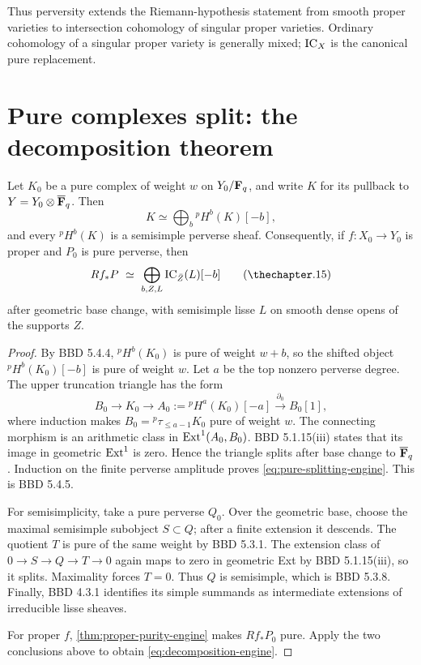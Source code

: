 Thus perversity extends the Riemann-hypothesis statement from smooth proper
varieties to intersection cohomology of singular proper varieties.  Ordinary
cohomology of a singular proper variety is generally mixed; \(\operatorname{IC}_X\) is the
canonical pure replacement.

\section{Pure complexes split: the decomposition theorem}

\begin{theorem}
\label{thm:decomposition-engine}
Let \(K_0\) be a pure complex of weight \(w\) on \(Y_0/\mathbf F_q\), and write
\(K\) for its pullback to \(Y=Y_0\otimes\overline{\mathbf F}_q\).  Then
\[
  K\simeq\bigoplus_b{}^pH^b(K)[-b],
\tag{\thechapter.14}\label{eq:pure-splitting-engine}
\]
and every \({}^pH^b(K)\) is a semisimple perverse sheaf.  Consequently, if
\(f:X_0\to Y_0\) is proper and \(P_0\) is pure perverse, then
\[
 Rf_*P\ \simeq\
 \bigoplus_{b,Z,L}
 \IC_{\bar Z}(L)[-b]
\tag{\thechapter.15}\label{eq:decomposition-engine}
\]
after geometric base change, with semisimple lisse \(L\) on smooth dense
opens of the supports \(Z\).
\end{theorem}

\begin{proof}
By BBD 5.4.4, \({}^pH^b(K_0)\) is pure of weight \(w+b\), so the shifted
object \({}^pH^b(K_0)[-b]\) is pure of weight \(w\).  Let \(a\) be the top
nonzero perverse degree.  The upper truncation triangle has the form
\[
 B_0\longrightarrow K_0\longrightarrow
 A_0:={}^pH^a(K_0)[-a]\xrightarrow{\partial_0}B_0[1],
\]
where induction makes \(B_0={}^p\tau_{\leq a-1}K_0\) pure of weight \(w\).
The connecting morphism is an arithmetic class in
\(\operatorname{Ext}^1(A_0,B_0)\).  BBD 5.1.15(iii) states that its image in geometric
\(\operatorname{Ext}^1\) is zero.  Hence the triangle splits after base change to
\(\overline{\mathbf F}_q\).  Induction on the finite perverse amplitude proves
\eqref{eq:pure-splitting-engine}.  This is BBD 5.4.5.

For semisimplicity, take a pure perverse \(Q_0\).  Over the geometric base,
choose the maximal semisimple subobject \(S\subset Q\); after a finite
extension it descends.  The quotient \(T\) is pure of the same weight by
BBD 5.3.1.  The extension class of
\(0\to S\to Q\to T\to0\) again maps to zero in geometric Ext by
BBD 5.1.15(iii), so it splits.  Maximality forces \(T=0\).  Thus \(Q\) is
semisimple, which is BBD 5.3.8.  Finally, BBD 4.3.1 identifies its simple
summands as intermediate extensions of irreducible lisse sheaves.

For proper \(f\), \cref{thm:proper-purity-engine} makes \(Rf_*P_0\) pure.
Apply the two conclusions above to obtain
\eqref{eq:decomposition-engine}.
\end{proof}

